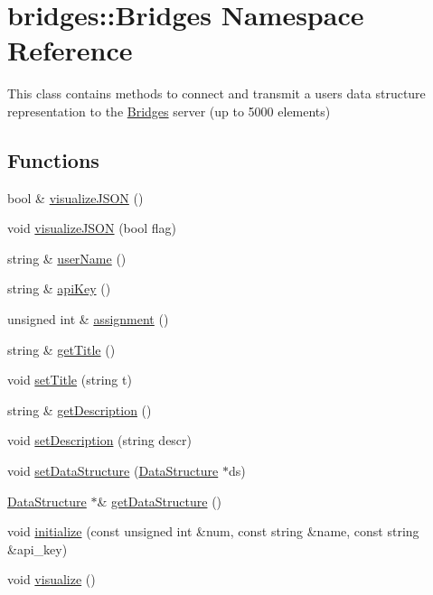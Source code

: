 \hypertarget{namespacebridges_1_1_bridges}{}\section{bridges\+:\+:Bridges Namespace Reference}
\label{namespacebridges_1_1_bridges}


This class contains methods to connect and transmit a user\textquotesingle{}s data structure representation to the \hyperlink{namespacebridges_1_1_bridges}{Bridges} server (up to 5000 elements)  


\subsection*{Functions}
\begin{DoxyCompactItemize}
\item 
bool \& \hyperlink{namespacebridges_1_1_bridges_a692124feb006d58c277db36c2e9342c8}{visualize\+J\+S\+ON} ()
\item 
void \hyperlink{namespacebridges_1_1_bridges_abb0f749a6dbcd0a430504f66de1dbe64}{visualize\+J\+S\+ON} (bool flag)
\item 
string \& \hyperlink{namespacebridges_1_1_bridges_a98c0c6658b8eb9e8f20a7f3119cbd984}{user\+Name} ()
\item 
string \& \hyperlink{namespacebridges_1_1_bridges_a4ec319d8c731624bd1aa0efa2427044e}{api\+Key} ()
\item 
unsigned int \& \hyperlink{namespacebridges_1_1_bridges_a97d6cfdc40ecead5d802ac2054933038}{assignment} ()
\item 
string \& \hyperlink{namespacebridges_1_1_bridges_acc332b802bfcede5a9ce257037b57043}{get\+Title} ()
\item 
void \hyperlink{namespacebridges_1_1_bridges_af36e132d582dabf5ae5ee8b8f26976db}{set\+Title} (string t)
\item 
string \& \hyperlink{namespacebridges_1_1_bridges_ac1475b5f38d5d8ad435df8f865f2d55b}{get\+Description} ()
\item 
void \hyperlink{namespacebridges_1_1_bridges_ada1bced1a3d7af3b8b139bbdfba72fc8}{set\+Description} (string descr)
\item 
void \hyperlink{namespacebridges_1_1_bridges_a7447e2d5808c492d26132690c1a639a7}{set\+Data\+Structure} (\hyperlink{classbridges_1_1_data_structure}{Data\+Structure} $\ast$ds)
\item 
\hyperlink{classbridges_1_1_data_structure}{Data\+Structure} $\ast$\& \hyperlink{namespacebridges_1_1_bridges_ad6eacdcf477c8f781482068f79632fd6}{get\+Data\+Structure} ()
\item 
void \hyperlink{namespacebridges_1_1_bridges_aff8e9d79f9e75cf20b51607ec385f189}{initialize} (const unsigned int \&num, const string \&name, const string \&api\+\_\+key)
\item 
void \hyperlink{namespacebridges_1_1_bridges_a2806e395134614cdd6327400b53d28ad}{visualize} ()
\end{DoxyCompactItemize}


